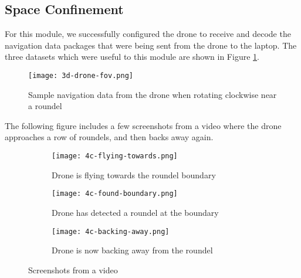 \onecolumn

\begin{multicols}{2}
\subsection{Space Confinement}

For this module, we successfully configured the drone to receive and decode the navigation data packages that were being sent from the drone to the laptop. The three datasets which were useful to this module are shown in Figure \ref{fig:4c-sample-nav}.

\begin{figure}[H]
      \centering
      \texttt{[image: 3d-drone-fov.png]}
      \caption{Sample navigation data from the drone when rotating clockwise near a roundel}
      \label{fig:4c-sample-nav}
\end{figure}

The following figure includes a few screenshots from a video where the drone approaches a row of roundels, and then backs away again.

\end{multicols}
\begin{figure}
        \begin{subfigure}[b]{0.25\textwidth}
                \texttt{[image: 4c-flying-towards.png]}
                \caption{Drone is flying towards the roundel boundary}
        \end{subfigure}%
        \hspace{\fill}
        \begin{subfigure}[b]{0.25\textwidth}
                \texttt{[image: 4c-found-boundary.png]}
                \caption{Drone has detected a roundel at the boundary}
        \end{subfigure}%
        \hspace{\fill}
        \begin{subfigure}[b]{0.25\textwidth}
                \texttt{[image: 4c-backing-away.png]}
                \caption{Drone is now backing away from the roundel}
        \end{subfigure}
        \caption{Screenshots from a video}\label{fig:4c-video}
\end{figure}
\twocolumn
